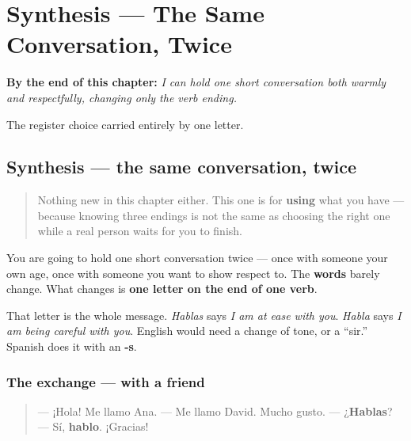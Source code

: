 
\chapter{Synthesis --- The Same Conversation, Twice}
\label{ch:synthesis-ar-singular}

\begin{chapteropening}
\textbf{By the end of this chapter:} \emph{I can hold one short conversation both warmly and respectfully, changing only the verb ending.}

The register choice carried entirely by one letter.
\end{chapteropening}

\section[Practice]{Synthesis — the same conversation, twice}

\label{lesson:ES-C06-repaso-hablar}



\begin{quote}
Nothing new in this chapter either. This one is for \textbf{using} what you have — because knowing three endings is not the same as choosing the right one while a real person waits for you to finish.
\end{quote}

\begin{grammarlens}[title={Grammar Lens: what the ending is really saying}]
You are going to hold one short conversation twice — once with someone your own age, once with someone you want to show respect to. The \textbf{words} barely change. What changes is \textbf{one letter on the end of one verb}.

That letter is the whole message. \emph{Hablas} says \emph{I am at ease with you}. \emph{Habla} says \emph{I am being careful with you}. English would need a change of tone, or a \textquotedblleft{}sir.\textquotedblright{} Spanish does it with an \textbf{-s}.
\end{grammarlens}

\subsection*{The exchange — with a friend}
\begin{quote}
— ¡Hola! Me llamo Ana. — Me llamo David. Mucho gusto. — ¿\textbf{Hablas}? — Sí, \textbf{hablo}. ¡Gracias!
\end{quote}

